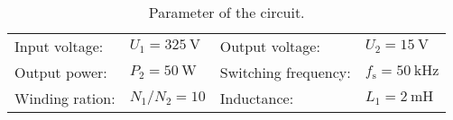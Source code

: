 
\begin{table}[ht]
    \centering  %
    \begin{tabular}{llll}
        \toprule
        Input voltage: &  $U_{\mathrm{1}} = \SI{325}{\volt}$ & Output voltage: & $U_{\mathrm{2}} = \SI{15}{\volt}$ \\ 
        Output power: & $P_{\mathrm{2}} = \SI{50}{\watt}$ & Switching frequency: & $f_{\mathrm{s}} = \SI{50}{\kilo\hertz}$ \\
        Winding ration: &  $N_{\mathrm{1}}/N_{\mathrm{2}}=10$ & Inductance: & $L_{\mathrm{1}}=\SI{2}{\milli\henry}$  \\
        \bottomrule
    \end{tabular}
    \caption{Parameter of the circuit.}
    \label{table:Ex04_Forward converter with asymmetric half-bridge}
\end{table}